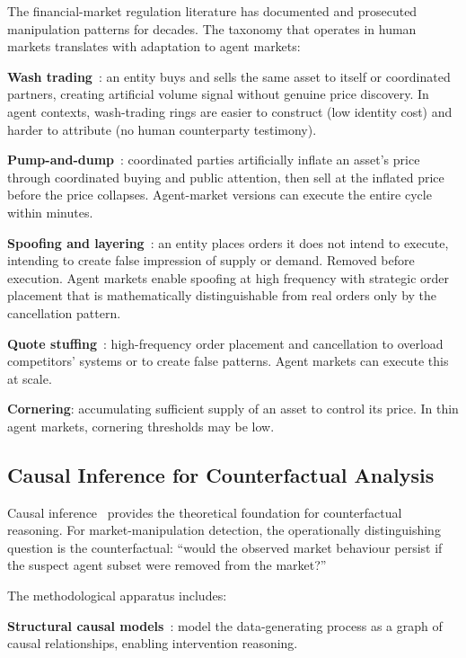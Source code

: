 \documentclass[sigconf,nonacm]{acmart}
\begin{document}
The financial-market regulation literature has documented and
prosecuted manipulation patterns for decades. The taxonomy that
operates in human markets translates with adaptation to agent
markets:

\textbf{Wash trading}~\cite{cumming2024washtrading}: an entity buys
and sells the same asset to itself or coordinated partners, creating
artificial volume signal without genuine price discovery. In
agent contexts, wash-trading rings are easier to construct (low
identity cost) and harder to attribute (no human counterparty
testimony).

\textbf{Pump-and-dump}~\cite{xu2024pumpdump}: coordinated parties
artificially inflate an asset's price through coordinated buying and
public attention, then sell at the inflated price before the price
collapses. Agent-market versions can execute the entire cycle
within minutes.

\textbf{Spoofing and layering}~\cite{wang2024spoofing}: an entity
places orders it does not intend to execute, intending to create
false impression of supply or demand. Removed before execution. Agent
markets enable spoofing at high frequency with strategic order
placement that is mathematically distinguishable from real orders
only by the cancellation pattern.

\textbf{Quote stuffing}~\cite{ye2024quotestuffing}: high-frequency
order placement and cancellation to overload competitors' systems
or to create false patterns. Agent markets can execute this at scale.

\textbf{Cornering}: accumulating sufficient supply of an asset to
control its price. In thin agent markets, cornering thresholds may
be low.

\subsection{Causal Inference for Counterfactual Analysis}

Causal inference~\cite{pearl2009causality} provides the theoretical
foundation for counterfactual reasoning. For market-manipulation
detection, the operationally distinguishing question is the
counterfactual: ``would the observed market behaviour persist if
the suspect agent subset were removed from the market?''

The methodological apparatus includes:

\textbf{Structural causal models}~\cite{pearl2009causality}: model
the data-generating process as a graph of causal relationships,
enabling intervention reasoning.
\end{document}
